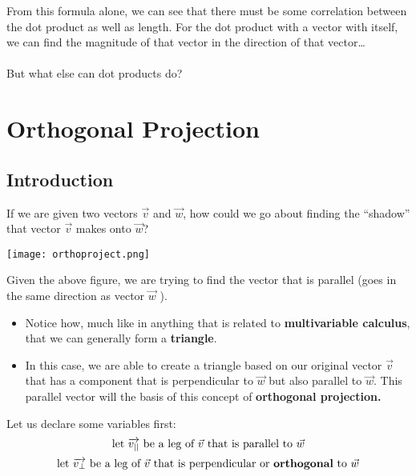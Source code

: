 \documentclass{report}
\begin{document}
\begin{sloppypar}
\begin{center}
{{    }
  }
\end{center}

From this formula alone, we can see that there
must be some correlation between the dot product as
well as length. For the dot product with a vector
with itself, we can find the magnitude of that
vector in the direction of that vector\dots \\
\\
But what else can dot products do?
\section{Orthogonal Projection}
\subsection{Introduction}
If we are given two vectors $ \vec{v}$ and $ \vec{w}$,
how could we go about finding the ``shadow'' that
vector $ \vec{v}$ makes onto $ \vec{w}$?

\begin{center}
  \texttt{[image: orthoproject.png]}
\end{center}
Given the above figure, we are trying to find the
vector that is parallel (goes in the same direction
as vector $ \vec{w}$ ).
\begin{itemize}
  \item Notice how, much like in anything that is
        related to \textbf{multivariable calculus}, that
        we can generally form a \textbf{triangle}.
  \item In this case, we are able to create
        a triangle based on our original vector $ \vec{v}$
        that has a component that is perpendicular to
        $ \vec{w}$ but also parallel to $ \vec{w}$.
        This parallel vector will the basis of this
        concept of \textbf{orthogonal projection.}
\end{itemize}

Let us declare some variables first:
\[ \textrm{let $ \overrightarrow{v_{||}}$ be a leg of $ \vec{v}$
    that is parallel to $ \vec{w} $}\]
\[ \textrm{let $ \overrightarrow{v_{\perp}}$ be a leg of
    $ \vec{v}$ that is perpendicular or
  \textbf{orthogonal} to $ \vec{w}$}\]


\end{sloppypar}
\end{document}
